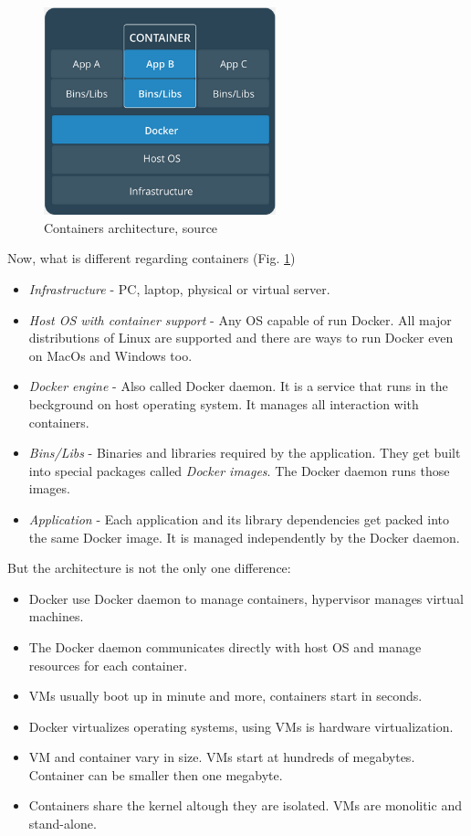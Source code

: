 \documentclass[12pt,a4paper]{article}
\begin{document}
\begin{figure}[h!]
\centering
\includegraphics[width=0.6\textwidth]{img/Docker_container}
\caption{Containers architecture, source \cite{Docker_docs}}
\label{fig:Docker_container}
\end{figure}

\noindent
Now, what is different regarding containers (Fig. \ref{fig:Docker_container})
\begin{itemize}
\item \textit{Infrastructure} - PC, laptop, physical or virtual server.
\item \textit{Host OS with container support} - Any OS capable of run Docker. All major distributions of Linux are supported and there are ways
to run Docker even on MacOs and Windows too.
\item \textit{Docker engine} - Also called Docker daemon. It is a service that runs in the beckground on host operating system. It manages all
interaction with containers.
\item \textit{Bins/Libs} - Binaries and libraries required by the application. They get built into special packages called \textit{Docker images}.
The Docker daemon runs those images.
\item \textit{Application} - Each application and its library dependencies get packed into the same Docker image. It is managed independently by the Docker daemon. 
\end{itemize}

\noindent
But the architecture is not the only one difference:
\begin{itemize}
\item Docker use Docker daemon to manage containers, hypervisor manages virtual machines.
\item The Docker daemon communicates directly with host OS and manage resources for each container.
\item VMs usually boot up in minute and more, containers start in seconds.
\item Docker virtualizes operating systems, using VMs is hardware virtualization.
\item VM and container vary in size. VMs start at hundreds of megabytes. Container can be smaller then one megabyte.
\item Containers share the kernel altough they are isolated. VMs are monolitic and stand-alone.
\end{itemize}
\end{document}
